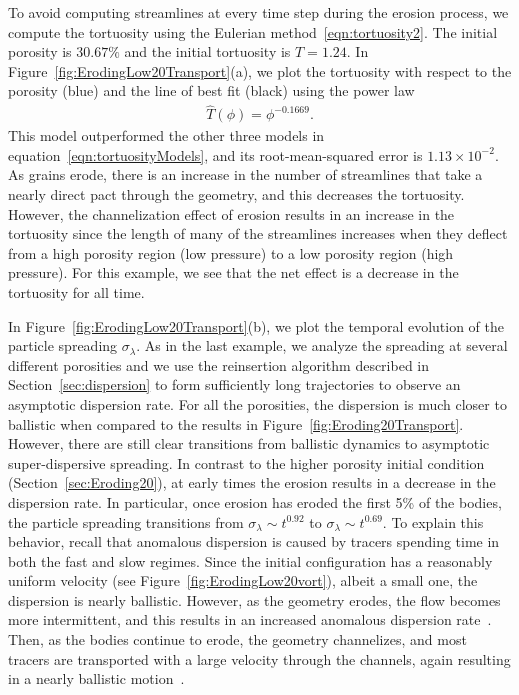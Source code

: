 \documentclass[preprint,10pt]{elsarticle}
\begin{document}
To avoid computing streamlines at every time step during the erosion
process, we compute the tortuosity using the Eulerian
method~\eqref{eqn:tortuosity2}.  The initial porosity is $30.67\%$ and
the initial tortuosity is $T = 1.24$.  In
Figure~\ref{fig:ErodingLow20Transport}(a), we plot the tortuosity with
respect to the porosity (blue) and the line of best fit (black) using
the power law 
\begin{align}
  \widehat{T}(\phi) = \phi^{-0.1669}.
\end{align}
This model outperformed the other three models in
equation~\eqref{eqn:tortuosityModels}, and its root-mean-squared error
is $1.13 \times 10^{-2}$.  As grains erode, there is an increase in the
number of streamlines that take a nearly direct pact through the
geometry, and this decreases the tortuosity. However, the channelization
effect of erosion results in an increase in the tortuosity since the
length of many of the streamlines increases when they deflect from a
high porosity region (low pressure) to a low porosity region (high
pressure). For this example, we see that the net effect is a decrease in
the tortuosity for all time.

In Figure~\ref{fig:ErodingLow20Transport}(b), we plot the temporal
evolution of the particle spreading $\sigma_\lambda$.  As in the last
example, we analyze the spreading at several different porosities and we
use the reinsertion algorithm described in Section~\ref{sec:dispersion}
to form sufficiently long trajectories to observe an asymptotic
dispersion rate.  For all the porosities, the dispersion is much closer
to ballistic when compared to the results in
Figure~\ref{fig:Eroding20Transport}.  However, there are still clear
transitions from ballistic dynamics to asymptotic super-dispersive
spreading.  In contrast to the higher porosity initial condition
(Section~\ref{sec:Eroding20}), at early times the erosion results in a
decrease in the dispersion rate. In particular, once erosion has eroded
the first 5\% of the bodies, the particle spreading transitions from
$\sigma_\lambda \sim t^{0.92}$ to $\sigma_\lambda \sim t^{0.69}$.  To
explain this behavior, recall that anomalous dispersion is caused by
tracers spending time in both the fast and slow regimes.  Since the
initial configuration has a reasonably uniform velocity (see
Figure~\ref{fig:ErodingLow20vort}), albeit a small one, the dispersion
is nearly ballistic. However, as the geometry erodes, the flow becomes
more intermittent, and this results in an increased anomalous dispersion
rate~\cite{dea-leb-den-tar-bol-dav2013}.  Then, as the bodies continue
to erode, the geometry channelizes, and most tracers are transported
with a large velocity through the channels, again resulting in a nearly
ballistic motion~\cite{sie-ili-pri-riv-gua2019}.
\end{document}
